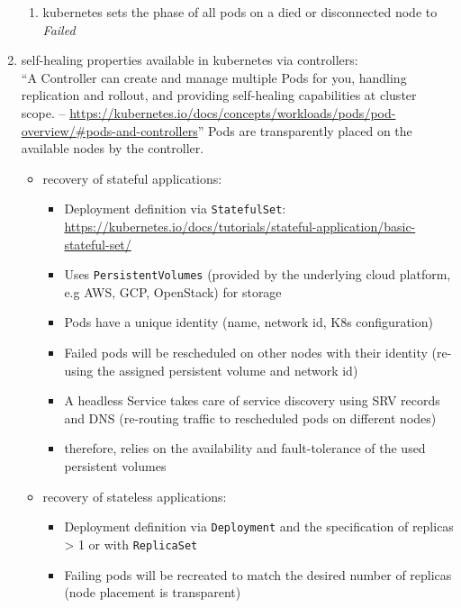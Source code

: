 \begin{enumerate}
\begin{enumerate}
        \item \gls{kubernetes} sets the phase of all pods on a died or disconnected node to \textit{Failed}
      \end{enumerate}
    \item self-healing properties available in \gls{kubernetes} via controllers:\hfill\\
          \enquote{A Controller can create and manage multiple Pods for you, handling replication and rollout, and providing self-healing capabilities at cluster scope. -- \url{https://kubernetes.io/docs/concepts/workloads/pods/pod-overview/\#pods-and-controllers}}
          Pods are transparently placed on the available nodes by the controller.

          \begin{itemize}
            \item recovery of stateful applications:
              \begin{itemize}
                \item Deployment definition via \texttt{StatefulSet}: \url{https://kubernetes.io/docs/tutorials/stateful-application/basic-stateful-set/}
                \item  Uses \texttt{PersistentVolumes} (provided by the underlying cloud platform, e.g AWS, GCP, OpenStack) for storage
                \item Pods have a unique identity (name, network id, K8s configuration)
                \item Failed pods will be rescheduled on other nodes with their identity (re-using the assigned persistent volume and network id)
                \item A headless Service takes care of service discovery using SRV records and DNS (re-routing traffic to rescheduled pods on different nodes)
                \item therefore, relies on the availability and fault-tolerance of the used persistent volumes
              \end{itemize}

            \item recovery of stateless applications:
              \begin{itemize}
                \item Deployment definition via \texttt{Deployment} and the specification of replicas > 1 or with \texttt{ReplicaSet}
                \item Failing pods will be recreated to match the desired number of replicas (node placement is transparent)
              \end{itemize}


\end{itemize}
\end{enumerate}
